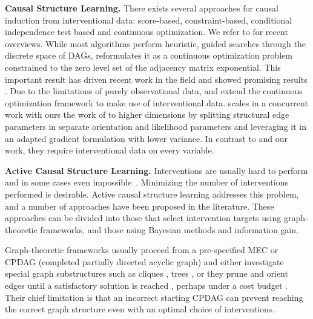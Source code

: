 \documentclass[nohyperref]{article}
\theoremstyle{plain}
\theoremstyle{definition}
\theoremstyle{remark}
\begin{document}
\textbf{Causal Structure Learning.} There exists several approaches for causal induction from interventional data: score-based, constraint-based, conditional independence test based and continuous optimization. We refer to \citep{heinze2018causal, vowels2021d} for recent overviews.  While most algorithms perform heuristic, guided searches through the discrete space of DAGs, \citet{zheng2018dags} reformulates it as a continuous optimization problem constrained to the zero level set of the adjacency matrix exponential. This important result has driven recent work in the field and showed promising results \citep{kalainathan2018sam, yu2019dag, ng2019graph, lachapelle2020gradient-based, zheng2020learning, Zhu2020Causal}. Due to the limitations of purely observational data, \citet{ke2019learning} and \citet{brouillard2020differentiable} extend the continuous optimization framework to make use of interventional data. \citet{lippe2021efficient} scales in a concurrent work with ours the work of \citep{ke2019learning} to higher dimensions by splitting structural edge parameters in separate orientation and likelihood parameters and leveraging it in an adapted gradient formulation with lower variance. In contrast to \citep{brouillard2020differentiable, ke2019learning} and our work, they require interventional data on every variable. 

\textbf{Active Causal Structure Learning.} Interventions are usually hard to perform and in some cases even impossible~\citep{peters2017elements}. Minimizing the number of interventions performed is desirable. Active causal structure learning addresses this problem, and a number of approaches have been proposed in the literature. These approaches can be divided into those that select intervention targets using graph-theoretic frameworks, and those using Bayesian methods and information gain.

Graph-theoretic frameworks usually proceed from a pre-specified MEC or CPDAG (completed partially directed acyclic graph) and either investigate special graph substructures \citep{he2008active} such as cliques \citep{eberhardt2012almost, squires2020active}, trees \citep{greenewald2019sample}, or they prune and orient edges until a satisfactory solution is reached \citep{ghassami2018budgeted,ghassami2019interventional,hyttinen2013experiment}, perhaps under a cost budget \citep{kocaoglu2017cost,lindgren2018experimental}. Their chief limitation is that an incorrect starting CPDAG can prevent reaching the correct graph structure even with an optimal choice of interventions.
\end{document}
